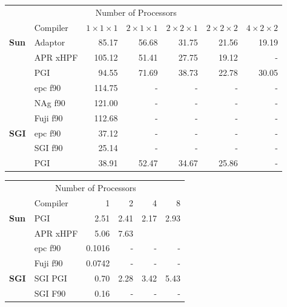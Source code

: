 \documentclass{article}
\begin{document}
{\newpage
\clearpage
\samepage \begin{table}[H]\begin{center}
\begin{center}
\begin{tabular}{|l|l|r|r|r|r|r|}\hline
	\mbox{}	    &\multicolumn{5}{c}{Number of Processors}\\ 
&	Compiler & $1\times 1\times 1$   &$2\times 1\times 1$
&$2\times 2\times 1$ &$2\times 2\times 2$ &$4\times 2\times 2$ \\ \hline\hline
{{\bf Sun}} &
	Adaptor     &85.17  & 56.68 & 31.75 & 21.56 & 19.19 \\ 
&	APR xHPF    &105.12 &51.41  & 27.75 & 19.12 & -     \\ 
&	PGI         &94.55  & 71.69 & 38.73 & 22.78 & 30.05 \\ \cline{2-7}
&	epc f90     &114.75 & -     & -     & -     & -     \\ 
&	NAg f90     &121.00 & -     & -     & -     & -     \\ 
&	Fuji f90    &112.68 & -     & -     & -     & -     \\ \hline\hline
{{\bf SGI}} &
	epc f90 & 37.12 & -     & -     & -     & -     \\ 
&	SGI f90     & 25.14 & -     & -     & -     & -     \\ \cline{2-7}
&	PGI     & 38.91 & 52.47 & 34.67 & 25.86 & -     \\ \hline
\end{tabular}

\label{PDE1:uxa:Tab}
\end{center}
\end{center}\end{table}
}

{\newpage
\clearpage
\samepage \begin{table}[H]\begin{center}
\begin{center}
\begin{tabular}{|l|l|r|r|r|r|}\hline
& \multicolumn{4}{c}{Number of Processors}\\ 
            & Compiler  & 1     & 2      & 4 & 8     \\ \hline\hline
{{\bf Sun}} &PGI        & 2.51  & 2.41   & 2.17 & 2.93  \\ 
	    &APR xHPF       & 5.06          & 7.63          & &       \\ \hline
&epc f90                 &0.1016         & -             & - & -     \\ 
&Fuji f90                &0.0742         & -             & - & -     \\ \hline
{{\bf SGI}} &SGI PGI                 & 0.70          & 2.28          & 3.42 & 5.43  \\ \hline
&SGI F90                 & 0.16          & -             & - & -     \\ \hline
\end{tabular}

\label{FFT1:uxa:Tab}
\end{center}

\end{center}\end{table}
}

\end{document}

